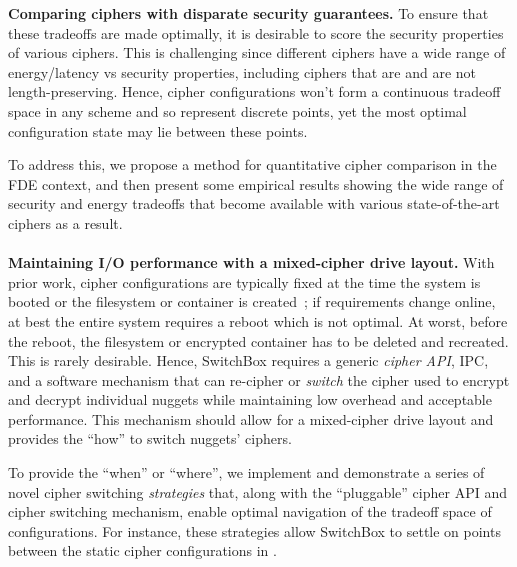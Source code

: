 \textbf{Comparing ciphers with disparate security guarantees.} To ensure that
these tradeoffs are made optimally, it is desirable to score the security
properties of various ciphers. This is challenging since different ciphers have
a wide range of energy/latency vs security properties, including ciphers that
are and are not length-preserving. Hence, cipher configurations won't form a
continuous tradeoff space in any scheme and so represent discrete points, yet
the most optimal configuration state may lie between these points.

To address this, we propose a method for quantitative cipher comparison in the
FDE context, and then present some empirical results showing the wide range of
security and energy tradeoffs that become available with various
state-of-the-art ciphers as a result.\\
\\
\textbf{Maintaining I/O performance with a mixed-cipher drive layout.} With
prior work, cipher configurations are typically fixed at the time the system is
booted or the filesystem or container is created~\cite{CiteAllTheFilesystems};
if requirements change online, at best the entire system requires a reboot which
is not optimal. At worst, before the reboot, the filesystem or encrypted
container has to be deleted and recreated. This is rarely desirable. Hence,
SwitchBox requires a generic \emph{cipher API}, IPC, and a software mechanism
that can re-cipher or \emph{switch} the cipher used to encrypt and decrypt
individual nuggets while maintaining low overhead and acceptable performance.
This mechanism should allow for a mixed-cipher drive layout and provides the
``how'' to switch nuggets' ciphers.

To provide the ``when'' or ``where'', we implement and demonstrate a series of
novel cipher switching \textit{strategies} that, along with the ``pluggable''
cipher API and cipher switching mechanism, enable optimal navigation of the
tradeoff space of configurations. For instance, these strategies allow SwitchBox
to settle on points between the static cipher configurations in
.

